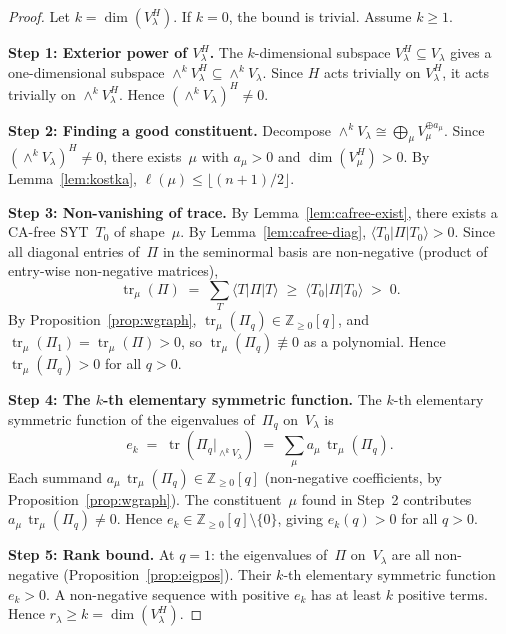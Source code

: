 \documentclass[11pt]{article}
\theoremstyle{definition}
\theoremstyle{remark}
\DeclareMathOperator{\tr}{tr}
\begin{document}
\begin{proof}
Let $k = \dim(V_\lambda^H)$. If $k = 0$, the bound is trivial.
Assume $k \ge 1$.

\smallskip\noindent\textbf{Step 1: Exterior power of $V_\lambda^H$.}
The $k$-dimensional subspace $V_\lambda^H \subseteq V_\lambda$ gives
a one-dimensional subspace
$\wedge^k V_\lambda^H \subseteq \wedge^k V_\lambda$. Since $H$ acts
trivially on $V_\lambda^H$, it acts trivially on $\wedge^k V_\lambda^H$.
Hence $(\wedge^k V_\lambda)^H \ne 0$.

\smallskip\noindent\textbf{Step 2: Finding a good constituent.}
Decompose $\wedge^k V_\lambda \cong \bigoplus_\mu V_\mu^{\oplus a_\mu}$.
Since $(\wedge^k V_\lambda)^H \ne 0$, there exists~$\mu$ with
$a_\mu > 0$ and $\dim(V_\mu^H) > 0$. By Lemma~\ref{lem:kostka},
$\ell(\mu) \le \lfloor(n+1)/2\rfloor$.

\smallskip\noindent\textbf{Step 3: Non-vanishing of trace.}
By Lemma~\ref{lem:cafree-exist}, there exists a CA-free SYT~$T_0$
of shape~$\mu$. By Lemma~\ref{lem:cafree-diag},
$\langle T_0|\Pi|T_0\rangle > 0$. Since all diagonal entries of~$\Pi$
in the seminormal basis are non-negative
(product of entry-wise non-negative matrices),
\[
  \tr_\mu(\Pi) \;=\; \sum_T \langle T|\Pi|T\rangle
  \;\ge\; \langle T_0|\Pi|T_0\rangle \;>\; 0.
\]
By Proposition~\ref{prop:wgraph}, $\tr_\mu(\Pi_q) \in
\mathbb{Z}_{\ge 0}[q]$, and $\tr_\mu(\Pi_1) = \tr_\mu(\Pi) > 0$,
so $\tr_\mu(\Pi_q) \not\equiv 0$ as a polynomial. Hence
$\tr_\mu(\Pi_q) > 0$ for all $q > 0$.

\smallskip\noindent\textbf{Step 4: The $k$-th elementary symmetric function.}
The $k$-th elementary symmetric function of the eigenvalues of~$\Pi_q$
on~$V_\lambda$ is
\[
  e_k \;=\; \tr(\Pi_q|_{\wedge^k V_\lambda})
  \;=\; \sum_\mu a_\mu\,\tr_\mu(\Pi_q).
\]
Each summand $a_\mu\,\tr_\mu(\Pi_q) \in \mathbb{Z}_{\ge 0}[q]$
(non-negative coefficients, by Proposition~\ref{prop:wgraph}).
The constituent~$\mu$ found in Step~2 contributes
$a_\mu\,\tr_\mu(\Pi_q) \ne 0$. Hence
$e_k \in \mathbb{Z}_{\ge 0}[q] \setminus \{0\}$, giving
$e_k(q) > 0$ for all $q > 0$.

\smallskip\noindent\textbf{Step 5: Rank bound.}
At $q = 1$: the eigenvalues of~$\Pi$ on~$V_\lambda$ are all non-negative
(Proposition~\ref{prop:eigpos}). Their $k$-th elementary symmetric
function $e_k > 0$. A non-negative sequence with positive $e_k$
has at least $k$ positive terms. Hence
$r_\lambda \ge k = \dim(V_\lambda^H)$.
\end{proof}
\end{document}
